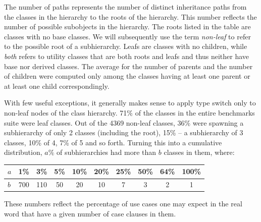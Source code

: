 The number of paths represents the number of distinct inheritance paths from the 
classes in the hierarchy to the roots of the hierarchy. This number reflects the number of possible subobjects in the 
hierarchy. The roots listed in the table are classes with no base classes. We 
will subsequently use the term \emph{non-leaf} to refer to the possible root of 
a subhierarchy. Leafs are classes with no children, while \emph{both} refers to 
utility classes that are both roots and leafs and thus neither have base nor 
derived classes. The average for the number of parents and the number of 
children were computed only among the classes having at least one parent or at 
least one child correspondingly.

With few useful exceptions, it generally makes sense to apply type switch only 
to non-leaf nodes of the class hierarchy. 71\% of the classes in the entire 
benchmarks suite were leaf classes. Out of the 4369 non-leaf classes, 36\% were 
spawning a subhierarchy of only 2 classes (including the root), 15\% -- a 
subhierarchy of 3 classes, 10\% of 4, 7\% of 5 and so forth. 
Turning this into a cumulative distribution, $a\%$ of subhierarchies had more 
than $b$ classes in them, where:

\begin{tabular}
{l||@{ }c@{ }|@{ }c@{ }|@{ }c@{ }|@{ }c@{ }|@{ }c@{ }|@{ }c@{ }|@{ }c@{ }|@{ }c@{ }|@{ }c@{ }}
$a$ & 1\% & 3\% & 5\% & 10\% & 20\% & 25\% & 50\% & 64\% & 100\% \\
\hline %
$b$ & 700 & 110 & 50  & 20   & 10   & 7    & 3    & 2    & 1
\end{tabular}


\noindent
These numbers reflect the percentage of use cases one may expect in the real 
word that have a given number of case clauses in them.

